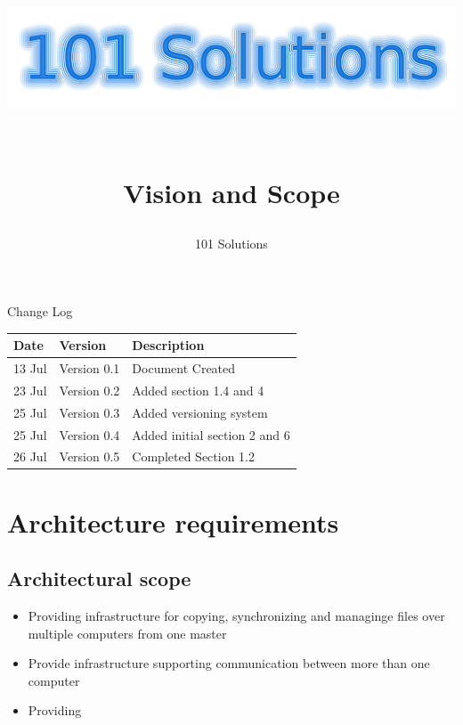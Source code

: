 \documentclass[a4paper,12pt,final]{article}
\title{
\begin{center}
  	\includegraphics[scale=0.3]{101Logo.png} 
  \end{center}
  \textbf{\\}
Vision and Scope\\
}
\author{101 Solutions}
\begin{document}
\maketitle
\thispagestyle{empty}
\newpage
\tableofcontents
\thispagestyle{empty}
\newpage
Change Log
\vspace{6pt}\newline
\begin{tabular}{|l|l|l|}
\hline
Date & Version & Description\\
\hline
13 Jul & Version 0.1 & Document Created\\
\hline
23 Jul & Version 0.2 & Added section 1.4 and 4\\
\hline
25 Jul & Version 0.3 & Added versioning system\\
\hline
25 Jul & Version 0.4 & Added initial section 2 and 6\\
\hline
26 Jul & Version 0.5 & Completed Section 1.2\\
\hline
\end{tabular}

\section{Architecture requirements}
\subsection{Architectural scope}
\begin{itemize}
\item Providing infrastructure for copying, synchronizing and managinge files over multiple computers from one master
\item Provide infrastructure supporting communication between more than one computer
\item Providing 
\end{itemize}
\end{document}
